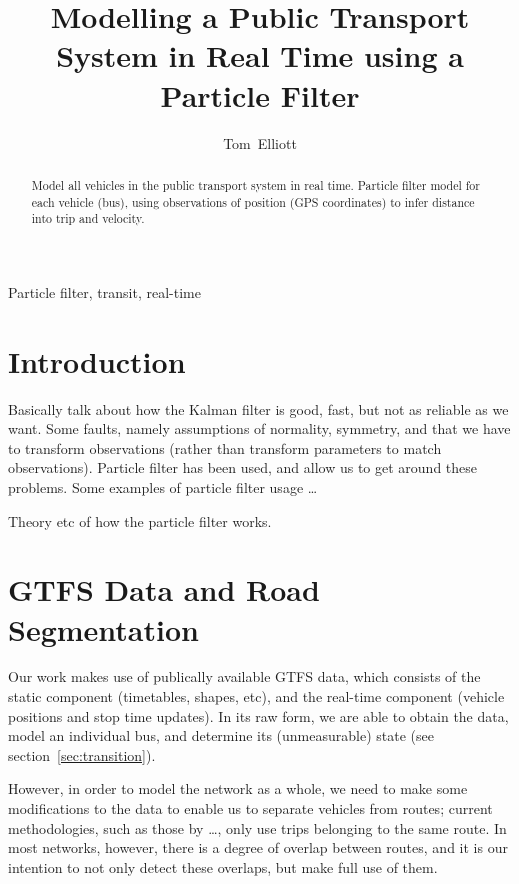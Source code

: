 \documentclass{IEEEtran}
\title{Modelling a Public Transport System in Real Time using a Particle Filter}
\author{Tom~Elliott}
\begin{document}
\maketitle


\begin{abstract}
  Model all vehicles in the public transport system in real time.
  Particle filter model for each vehicle (bus),
  using observations of position (GPS coordinates) to infer distance into trip
  and velocity.
\end{abstract}

\begin{IEEEkeywords}
  Particle filter, transit, real-time
\end{IEEEkeywords}


\section{Introduction}
\label{sec:intro}


Basically talk about how the Kalman filter is good, fast, but not as reliable as we want.
Some faults, namely assumptions of normality, symmetry, and that we have to transform observations
(rather than transform parameters to match observations).
Particle filter has been used, and allow us to get around these problems.
Some examples of particle filter usage \ldots



Theory etc of how the particle filter works.




\section{GTFS Data and Road Segmentation}
\label{sec:gtfs}

Our work makes use of publically available GTFS data,
which consists of the static component (timetables, shapes, etc),
and the real-time component (vehicle positions and stop time updates).
In its raw form, we are able to obtain the data,
model an individual bus, and determine its (unmeasurable) state
(see section~\ref{sec:transition}).


However, in order to model the network as a whole, 
we need to make some modifications to the data to enable us to 
separate vehicles from routes;
current methodologies, such as those by \ldots,
only use trips belonging to the same route.
In most networks, however,
there is a degree of overlap between routes,
and it is our intention to not only detect these overlaps,
but make full use of them.
\end{document}
